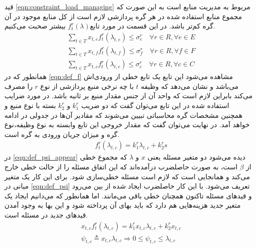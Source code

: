 	قید \cref{eqn:constraint_load_managing} مربوط به مدیریت منابع است به این‌ صورت که مجموع منابع استفاده شده در هر گره پردازشی لازم است از کل منابع موجود در آن گره کم‌تر باشد. در این قسمت در مورد تابع$f_t^r(\lambda)$ بیشتر صحبت می‌کنیم.
	\begin{subequations}\label{eqn:constraint_load_managing}
		\begin{align}
		&\sum_{t \in T}x_{t,e}f_t^r(\lambda_{t,e}) \le \sigma_e^r \quad \forall{r \in R}, \forall{e \in E} \\
		&\sum_{t \in T}x_{t,f}f_t^r(\lambda_{t,f}) \le \sigma_f^r \quad \forall{r \in R}, \forall{f \in F} \\
		&\sum_{t \in T}x_{t,c}f_t^r(\lambda_{t,c}) \le \sigma_c^r \quad \forall{r \in R}, \forall{c \in C}
		\end{align}
	\end{subequations}
	همانطور که در \cref{eqn:def_f} مشاهده می‌شود این تابع یک تابع خطی از ورودی‌اش می‌باشد و نشان می‌دهد که وظیفه $t$ با چه نرخی منبع پردازشی از نوع $r$ را مصرف می‌کند بابراین لازم است که واحد آن از جنس مقدار منبع بر ثانیه باشد. در مورد ضرایب استفاده شده در این تابع می‌توان گفت که دو ضریب $k_1^r$ و $k_2^r$ بسته با نوع منبع و همچنین مشخصات گره محاسباتی تبیین می‌شوند که مقادیر آن‌ها در جدولی در ادامه خواهد آمد. در نهایت می‌توان گفت که مقدار خروجی این تابع وابسته به نوع وظیفه،نوع گره و میزان جریان ورودی به گره است.
	\begin{align}\label{eqn:def_f}
		&f_t^r(\lambda_{t,c}) = k_1^r\lambda_{t,c} + k_2^rs
	\end{align}
	در \cref{eqn:def_psi_appear} دیده می‌شود دو متغیر مسئله یعنی $x$ و $\lambda$ که مجموع خطی از $\beta$ است، به صورت حاصلضرب درآمده‌اند که این اتفاق مسئله را از حالت خطی خارج می‌کند و همانجایی است که لازم است مسئله خطی‌سازی شود. برای این کار یک متغیر میانی در \cref{eqn:def_psi} تعریف می‌شود. با این کار حاصلضرب ایجاد شده از بین می‌رود و قیدهای مسئله تاکنون همچنان خطی باقی می‌مانند. اما همانطور که می‌دانیم ایجاد یک متغیر جدید هزینه‌هایی هم دارد که باید بهای آن پرداخته شود و این بها به وجود آمدن قیدهای جدید در مسئله است. 
	\begin{subequations}
		\begin{align}
			&x_{t,c}f_t^r(\lambda_{t,c}) = k_1^rx_{t,c}\lambda_{t,c} + k_2^rx_{t,c} \label{eqn:def_psi_appear} \\
			&\psi_{t,c} \triangleq x_{t,c}\lambda_{t,c} \Rightarrow 0 \leq \psi_{t,c} \leq \lambda_{t,c} \label{eqn:def_psi}
		\end{align}
	\end{subequations}
